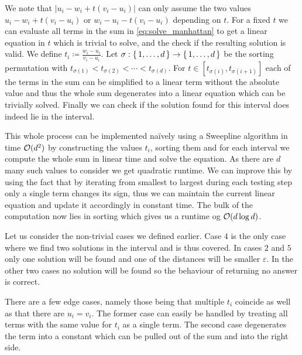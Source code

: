 We note that \(|u_i - w_i + t (v_i - u_i )|\) can only assume the two values \(u_i - w_i + t(v_i - u_i)\) or \(w_i - u_i - t(v_i - u_i)\) depending on \(t\). For a fixed \(t\) we can evaluate all terms in the sum in \cref{eq:solve_manhattan} to get a linear equation in \(t\) which is trivial to solve, and the check if the resulting solution is valid. We define \(t_i \coloneq \frac{w_i - u_i}{v_i - u_i} \). Let \(\sigma:\set{1,\dots, d} \to \set{1,\dots, d}\) be the sorting permutation with \(t_{\sigma(1)} < t_{\sigma(2)} < \cdots < t_{\sigma(d)}\). For \(t \in [t_{\sigma(i)}, t_{\sigma(i+1)}]\) each of the terms in the sum can be simplified to a linear term without the absolute value and thus the whole sum degenerates into a linear equation which can be trivially solved. Finally we can check if the solution found for this interval does indeed lie in the interval. 

This whole process can be implemented na\"ively using a Sweepline algorithm in time \(\mathcal{O}(d^2)\) by constructing the values \(t_i\), sorting them and for each interval we compute the whole sum in linear time and solve the equation. As there are \(d\) many such values to consider we get quadratic runtime. We can improve this by using the fact that by iterating from smallest to largest during each testing step only a single term changes its sign, thus we can maintain the current linear equation and update it accordingly in constant time. The bulk of the computation now lies in sorting which gives us a runtime og \(\mathcal{O}(d \log d)\). 

Let us consider the non-trivial cases we defined earlier. Case \(4\) is the only case where we find two solutions in the interval and is thus covered. In cases \(2\) and \(5\) only one solution will be found and one of the distances will be smaller \(\varepsilon\). In the other two cases no solution will be found so the behaviour of returning no answer is correct.

There are a few edge cases, namely those being that multiple \(t_i\) coincide as well as that there are \(u_i = v_i\). The former case can easily be handled by treating all terms with the same value for \(t_i\) as a single term. The second case degenerates the term into a constant which can be pulled out of the sum and into the right side.

